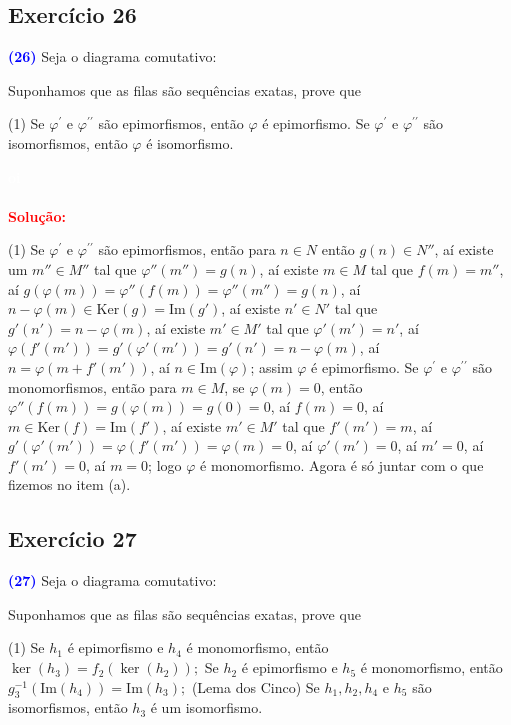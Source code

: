 \documentclass[11pt,a4paper]{article}
\newcommand{\exercicio}[1]{\subsection{Exercício #1} \textcolor{blue}{\bf(#1)}}
\newcommand{\dividiritens}[1]{\begin{tasks}[counter-format={(tsk[a])},label-width=3.6ex, label-format = {\bfseries}, column-sep = {0pt}](1) #1 \end{tasks}}
\newcommand{\pers}[1]{\textcolor{Floresta}{$\negrito{(#1)} $}}
\newcommand{\solucao}[1]{
\textbf{\textcolor{white}{oi}\\ \\ \textcolor{red}{Solução:}} #1}
\begin{document}
\exercicio{26} Seja o diagrama comutativo:
\begin{center}
\end{center}

Suponhamos que as filas são sequências exatas, prove que
\dividiritens{
\task[\pers{a}] Se $\varphi^\prime$ e $\varphi^{\prime \prime}$ são epimorfismos, então $\varphi$ é epimorfismo.
\task[\pers{b}] Se $\varphi^\prime$ e $\varphi^{\prime \prime}$ são isomorfismos, então $\varphi$ é isomorfismo.
}
\solucao{
\dividiritens{
\task[\pers{a}] Se $\varphi^\prime$ e $\varphi^{\prime \prime}$ são epimorfismos, então para $n\in N$ então $g(n)\in N''$, aí existe um $m''\in M''$ tal que $\varphi''(m'')=g(n)$, aí existe $m\in M$ tal que $f(m)=m''$, aí $g(\varphi(m))=\varphi''(f(m))=\varphi''(m'')=g(n)$, aí $n-\varphi(m)\in\mathrm{Ker}(g)=\mathrm{Im}(g')$, aí existe $n'\in N'$ tal que $g'(n')=n-\varphi(m)$, aí existe $m'\in M'$ tal que $\varphi'(m')=n'$, aí $\varphi(f'(m'))=g'(\varphi'(m'))=g'(n')=n-\varphi(m)$, aí $n=\varphi(m+f'(m'))$, aí $n\in\mathrm{Im}(\varphi)$; assim $\varphi$ é epimorfismo.
\task[\pers{b}] Se $\varphi^\prime$ e $\varphi^{\prime \prime}$ são monomorfismos, então para $m\in M$, se $\varphi(m)=0$, então $\varphi''(f(m))=g(\varphi(m))=g(0)=0$, aí $f(m)=0$, aí $m\in\mathrm{Ker}(f)=\mathrm{Im}(f')$, aí existe $m'\in M'$ tal que $f'(m')=m$, aí $g'(\varphi'(m'))=\varphi(f'(m'))=\varphi(m)=0$, aí $\varphi'(m')=0$, aí $m'=0$, aí $f'(m')=0$, aí $m=0$; logo $\varphi$ é monomorfismo. Agora é só juntar com o que fizemos no item (a).
}
}
\exercicio{27} Seja o diagrama comutativo:
\begin{center}
\end{center}
Suponhamos que as filas são sequências exatas, prove que
\dividiritens{
\task[\pers{a}] Se $h_1$ é epimorfismo e $h_4$ é monomorfismo, então $\ker(h_3) = f_2(\ker(h_2));$
\task[\pers{b}] Se $h_2$ é epimorfismo e $h_5$ é monomorfismo, então $g_3^{-1}(\mbox{Im}(h_4)) = \mbox{Im}(h_3);$
\task[\pers{c}] (Lema dos Cinco) Se $h_1, h_2, h_4$ e $h_5$ são isomorfismos, então $h_3$ é um isomorfismo.
}
\end{document}
